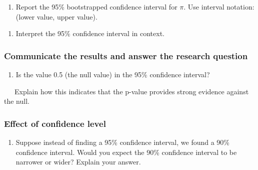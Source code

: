 \documentclass[
]{report}
\providecommand{\tightlist}{%
  \setlength{\itemsep}{0pt}\setlength{\parskip}{0pt}}
\begin{document}
\vspace{.7in}

\begin{enumerate}
\def\labelenumi{\arabic{enumi}.}
\setcounter{enumi}{8}
\tightlist
\item
  Report the 95\% bootstrapped confidence interval for \(\pi\). Use interval notation: (lower value, upper value).
\end{enumerate}

\vspace{0.2in}

\begin{enumerate}
\def\labelenumi{\arabic{enumi}.}
\setcounter{enumi}{9}
\tightlist
\item
  Interpret the 95\% confidence interval in context.
\end{enumerate}

\vspace{.7in}

\hypertarget{communicate-the-results-and-answer-the-research-question-1}{%
\subsubsection*{Communicate the results and answer the research question}\label{communicate-the-results-and-answer-the-research-question-1}}

\begin{enumerate}
\def\labelenumi{\arabic{enumi}.}
\setcounter{enumi}{10}
\tightlist
\item
  Is the value 0.5 (the null value) in the 95\% confidence interval?
\end{enumerate}

\vspace{.2in}

~~~Explain how this indicates that the p-value provides strong evidence against the null.

\newpage

\hypertarget{effect-of-confidence-level}{%
\subsubsection*{Effect of confidence level}\label{effect-of-confidence-level}}

\begin{enumerate}
\def\labelenumi{\arabic{enumi}.}
\setcounter{enumi}{11}
\tightlist
\item
  Suppose instead of finding a 95\% confidence interval, we found a 90\% confidence interval. Would you expect the 90\% confidence interval to be narrower or wider? Explain your answer.
\end{enumerate}
\end{document}
